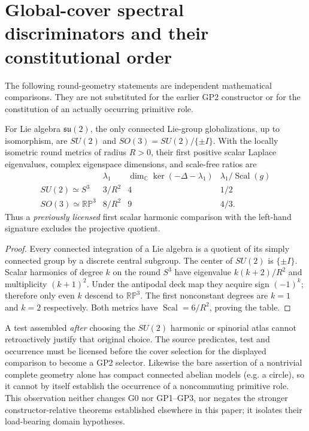\documentclass[12pt,a4paper]{article}
\begin{document}
\section{Global-cover spectral discriminators and their constitutional order}
\label{p2a:sec:v352-global-cover-tests}
The following round-geometry statements are independent mathematical
comparisons.  They are not substituted for the earlier GP2 constructor
or for the constitution of an actually occurring primitive role.

\begin{theorem}
\label{p2a:thm:v352-a1-global-scalar}
For Lie algebra $\mathfrak{su}(2)$, the only connected Lie-group
globalizations, up to isomorphism, are $SU(2)$ and
$SO(3)=SU(2)/\{\pm I\}$.  With the locally isometric round metrics of
radius $R>0$, their first positive scalar Laplace eigenvalues,
complex eigenspace dimensions, and scale-free ratios are
\[
\begin{array}{c|c|c|c}
 &\lambda_1&\dim_{\mathbb C}\ker(-\Delta-\lambda_1)&
 \lambda_1/\operatorname{Scal}(g)\\\hline
 SU(2)\simeq S^3&3/R^2&4&1/2\\
 SO(3)\simeq\mathbb{RP}^3&8/R^2&9&4/3.
\end{array}
\]
Thus a \emph{previously licensed} first scalar harmonic comparison
with the left-hand signature excludes the projective quotient.
\end{theorem}
\begin{proof}
Every connected integration of a Lie algebra is a quotient of its
simply connected group by a discrete central subgroup.  The center of
$SU(2)$ is $\{\pm I\}$.  Scalar harmonics of degree $k$ on the round
$S^3$ have eigenvalue $k(k+2)/R^2$ and multiplicity $(k+1)^2$.
Under the antipodal deck map they acquire sign $(-1)^k$; therefore
only even $k$ descend to $\mathbb{RP}^3$.  The first nonconstant
degrees are $k=1$ and $k=2$ respectively.  Both metrics have
$\operatorname{Scal}=6/R^2$, proving the table.
\end{proof}

\begin{remark}
\label{p2a:rem:v352-a1-chronology}
A test assembled \emph{after} choosing the $SU(2)$ harmonic or
spinorial atlas cannot retroactively justify that original choice.
The source predicates, test and occurrence must be licensed before the
cover selection for the displayed comparison to become a GP2 selector.
Likewise the bare assertion of a nontrivial complete geometry alone
has compact connected abelian models (e.g. a circle), so it cannot
by itself establish the occurrence of a noncommuting primitive role.
This observation neither changes G0 nor GP1--GP3, nor negates the
stronger constructor-relative theorems established elsewhere in this
paper; it isolates their load-bearing domain hypotheses.
\end{remark}
\end{document}
